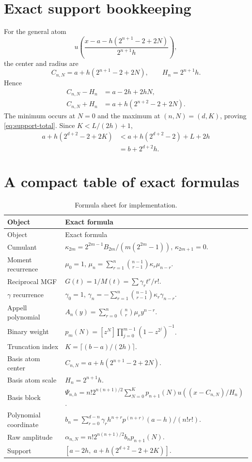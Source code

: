 \documentclass[11pt]{article}
\theoremstyle{definition}
\theoremstyle{remark}
\newcommand{\1}{\mathbf{1}}
\begin{document}
\section{Exact support bookkeeping}

For the general atom
\[
 u\!\left(
 \frac{x-a-h(2^{n+1}-2+2N)}{2^{n+1}h}
 \right),
\]
the center and radius are
\[
 C_{n,N}=a+h(2^{n+1}-2+2N),
 \qquad
 H_n=2^{n+1}h.
\]
Hence
\begin{align*}
 C_{n,N}-H_n&=a-2h+2hN,\\
 C_{n,N}+H_n&=a+h(2^{n+2}-2+2N).
\end{align*}
The minimum occurs at $N=0$ and the maximum at $(n,N)=(d,K)$, proving
\eqref{eq:support-total}.  Since $K< L/(2h)+1$,
\begin{align*}
 a+h(2^{d+2}-2+2K)
 &<a+h(2^{d+2}-2)+L+2h\\
 &=b+2^{d+2}h.
\end{align*}

\section{A compact table of exact formulas}

\begin{longtable}{@{}p{}p{}@{}}
\caption{Formula sheet for implementation.}\label{tab:formula-sheet}\\
\toprule
Object & Exact formula \\
\midrule
\endfirsthead
\toprule
Object & Exact formula \\
\midrule
\endhead
Cumulant & $\kappa_{2m}=2^{2m-1}B_{2m}/(m(2^{2m}-1))$, $\kappa_{2m+1}=0$.\\[0.4em]
Moment recurrence & $\mu_0=1$, $\mu_n=\sum_{r=1}^{n}\binom{n-1}{r-1}\kappa_r\mu_{n-r}$.\\[0.4em]
Reciprocal MGF & $G(t)=1/M(t)=\sum\gamma_rt^r/r!$.\\[0.4em]
$\gamma$ recurrence & $\gamma_0=1$, $\gamma_n=-\sum_{r=1}^{n}\binom{n-1}{r-1}\kappa_r\gamma_{n-r}$.\\[0.4em]
Appell polynomial & $A_n(y)=\sum_{r=0}^{n}\binom nr\mu_ry^{n-r}$.\\[0.4em]
Binary weight & $p_m(N)=[z^N]\prod_{j=0}^{m-1}(1-z^{2^j})^{-1}$.\\[0.4em]
Truncation index & $K=\lceil(b-a)/(2h)\rceil$.\\[0.4em]
Basis atom center & $C_{n,N}=a+h(2^{n+1}-2+2N)$.\\[0.4em]
Basis atom scale & $H_n=2^{n+1}h$.\\[0.4em]
Basis block & $\Psi_{n,h}=n!2^{n(n+1)/2}\sum_{N=0}^{K}p_{n+1}(N)u((x-C_{n,N})/H_n)$.\\[0.4em]
Polynomial coordinate & $b_n=\sum_{r=0}^{d-n}\gamma_rh^{n+r}p^{(n+r)}(a-h)/(n!r!)$.\\[0.4em]
Raw amplitude & $\alpha_{n,N}=n!2^{n(n+1)/2}b_np_{n+1}(N)$.\\[0.4em]
Support & $[a-2h,\;a+h(2^{d+2}-2+2K)]$.\\
\bottomrule
\end{longtable}
\end{document}
